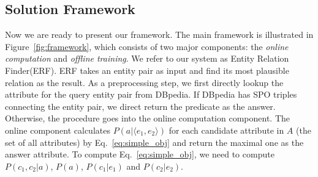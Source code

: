 
\subsection{Solution Framework}
Now we are ready to present our framework. The main framework is illustrated in Figure~\ref{fig:framework}, which consists of two major components: the {\it online computation} and {\it offline training}. We refer to our system as \ac{Entity Relation Finder(ERF)}.
ERF takes an entity pair as input and find its most plausible relation as the result.
As a preprocessing step, we first directly lookup the attribute for the query entity pair from DBpedia.
If DBpedia has SPO triples connecting the entity pair, we direct return the predicate as the answer.
Otherwise, the procedure goes into the online computation component.
The online component calculates $ P(a|  \langle e_1,e_2 \rangle  )$ for each candidate attribute in $A$ (the set of all attributes) by Eq.~\ref{eq:simple_obj} and return the maximal one as the answer attribute. To compute Eq.~\ref{eq:simple_obj}, we need to compute $P(c_1,c_2|a)$, $P(a)$, $P(c_1|e_1)$ and $P(c_2|e_2)$. 

